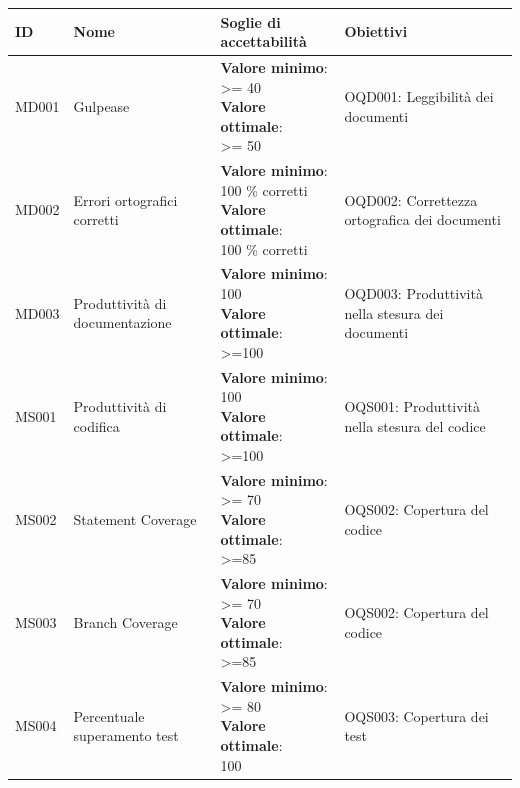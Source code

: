 {\begin{center}
	\begin{longtable}{|
			*{1}{>{\centering\arraybackslash}p{1.7 cm}|}
			*{1}{>{\centering\arraybackslash}p{2.3 cm}|}
			*{1}{>{\centering\arraybackslash}p{4.0 cm}|}
			*{1}{>{\centering\arraybackslash}p{2.4 cm}|}}
		\hline
		\textbf{ID} & \textbf{Nome} & \textbf{Soglie di accettabilità} & \textbf{Obiettivi}
		\\
		\hline \endhead
		\hline \endfoot
		
		\hline MD001 & Gulpease & \makecell{\textbf{Valore minimo}: \\ >= 40 \\ \textbf{Valore ottimale}: \\ >= 50} &  OQD001: Leggibilità dei documenti  \\
		\hline MD002 & Errori ortografici corretti & \makecell{\textbf{Valore minimo}: \\ 100 \% corretti \\ \textbf{Valore ottimale}: \\ 100 \% corretti} &  OQD002: Correttezza ortografica dei documenti  \\
		\hline MD003 & Produttività di documentazione & \makecell{\textbf{Valore minimo}: \\ 100  \\ \textbf{Valore ottimale}: \\ >=100} &  OQD003: Produttività nella stesura dei documenti  \\
		\hline MS001 & Produttività di codifica & \makecell{\textbf{Valore minimo}: \\ 100  \\ \textbf{Valore ottimale}: \\ >=100} &  OQS001: Produttività nella stesura del codice \\ 
		\hline MS002 & Statement Coverage & \makecell{\textbf{Valore minimo}: \\ >= 70  \\ \textbf{Valore ottimale}: \\ >=85} &  OQS002: Copertura del codice \\ 
		\hline MS003 & Branch Coverage & \makecell{\textbf{Valore minimo}: \\ >= 70  \\ \textbf{Valore ottimale}: \\ >=85} &  OQS002: Copertura del codice \\
		\hline MS004 & Percentuale superamento test & \makecell{\textbf{Valore minimo}: \\ >= 80  \\ \textbf{Valore ottimale}: \\ 100} &  OQS003: Copertura dei test \\

\end{longtable}
\end{center}}
